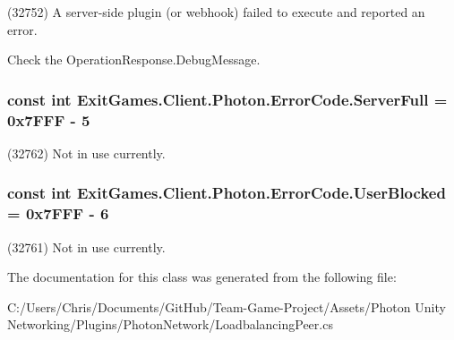 (32752) A server-\/side plugin (or webhook) failed to execute and reported an error. 

Check the Operation\+Response.\+Debug\+Message. 
\subsubsection[{\texorpdfstring{Server\+Full}{ServerFull}}]{\setlength{\rightskip}{0pt plus 5cm}const int Exit\+Games.\+Client.\+Photon.\+Error\+Code.\+Server\+Full = 0x7\+F\+F\+F -\/ 5}\hypertarget{class_exit_games_1_1_client_1_1_photon_1_1_error_code_ab8516a7e5eb0152044f8befd5cc583c4}{}\label{class_exit_games_1_1_client_1_1_photon_1_1_error_code_ab8516a7e5eb0152044f8befd5cc583c4}


(32762) Not in use currently.

\subsubsection[{\texorpdfstring{User\+Blocked}{UserBlocked}}]{\setlength{\rightskip}{0pt plus 5cm}const int Exit\+Games.\+Client.\+Photon.\+Error\+Code.\+User\+Blocked = 0x7\+F\+F\+F -\/ 6}\hypertarget{class_exit_games_1_1_client_1_1_photon_1_1_error_code_af82f564f81d5a4c27f09fe60c7854fc5}{}\label{class_exit_games_1_1_client_1_1_photon_1_1_error_code_af82f564f81d5a4c27f09fe60c7854fc5}


(32761) Not in use currently.



The documentation for this class was generated from the following file\+:\begin{DoxyCompactItemize}
\item 
C\+:/\+Users/\+Chris/\+Documents/\+Git\+Hub/\+Team-\/\+Game-\/\+Project/\+Assets/\+Photon Unity Networking/\+Plugins/\+Photon\+Network/Loadbalancing\+Peer.\+cs\end{DoxyCompactItemize}
